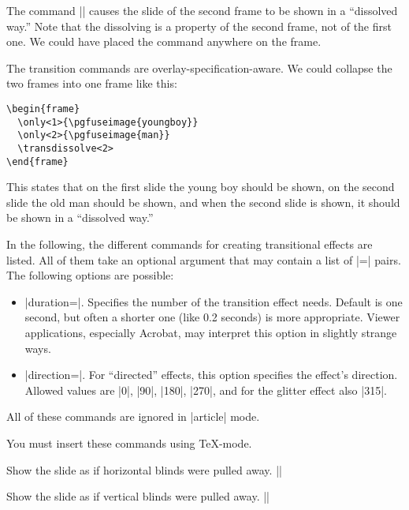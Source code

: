 The command |\transdissolve| causes the slide of the second frame to be shown in a ``dissolved way.'' Note that the dissolving is a property of the second frame, not of the first one. We could have placed the command anywhere on the frame.

The transition commands are overlay-specification-aware. We could collapse the two frames into one frame like this:

\begin{verbatim}
\begin{frame}
  \only<1>{\pgfuseimage{youngboy}}
  \only<2>{\pgfuseimage{man}}
  \transdissolve<2>
\end{frame}
\end{verbatim}

This states that on the first slide the young boy should be shown, on the second slide the old man should be shown, and when the second slide is shown, it should be shown in a ``dissolved way.''

In the following, the different commands for creating transitional effects are listed. All of them take an optional argument that may contain a list of |=| pairs. The following options are possible:

\begin{itemize}
\item
  |duration=|. Specifies the number of  the transition effect needs. Default is one second, but often a shorter one (like 0.2 seconds) is more appropriate. Viewer applications, especially Acrobat, may interpret this option in slightly strange ways.
\item
  |direction=|. For ``directed'' effects, this option specifies the effect's direction. Allowed values are |0|, |90|, |180|, |270|, and for the glitter effect also |315|.
\end{itemize}

\articlenote
All of these commands are ignored in |article| mode.

\lyxnote
You must insert these commands using \TeX-mode.

\begin{command}{\transblindshorizontal{}}
  Show the slide as if horizontal blinds were pulled away.
  \example|\transblindshorizontal|
\end{command}

\begin{command}{\transblindsvertical{}}
  Show the slide as if vertical blinds were pulled away.
  \example||
\end{command}

